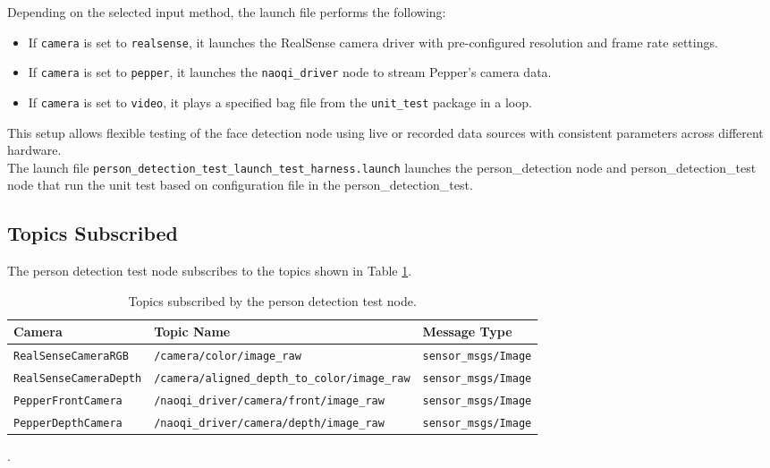 \documentclass{CSSRforAfrica}
\begin{document}
Depending on the selected input method, the launch file performs the following:

\begin{itemize}
	\item If \texttt{camera} is set to \texttt{realsense}, it launches the RealSense camera driver with pre-configured resolution and frame rate settings.
	\item If \texttt{camera} is set to \texttt{pepper}, it launches the \texttt{naoqi\_driver} node to stream Pepper’s camera data.
	\item If \texttt{camera} is set to \texttt{video}, it plays a specified bag file from the \texttt{unit\_test} package in a loop.
\end{itemize}

This setup allows flexible testing of the face detection node using live or recorded data sources with consistent parameters across different hardware.\\

The launch file \texttt{person\_detection\_test\_launch\_test\_harness.launch} launches the person\_detection node and person\_detection\_test node that run the unit test based on configuration file in the person\_detection\_test.

\subsection*{Topics Subscribed}
The person detection test node subscribes to the  topics shown in Table \ref{tab:topics}.

\begin{table}[!h]
	\centering
	{\fontsize{9.0}{12.0}\selectfont %
		\begin{tabularx}{\linewidth}{| l | l | X |}
			\hline
			\rowcolor{blue!20}
			\textbf{Camera} & \textbf{Topic Name} & \textbf{Message Type} \\
			\hline
			\texttt{RealSenseCameraRGB} & \texttt{/camera/color/image\_raw} & \texttt{sensor\_msgs/Image} \\
			\hline
			\texttt{RealSenseCameraDepth} & \texttt{/camera/aligned\_depth\_to\_color/image\_raw} & \texttt{sensor\_msgs/Image} \\
			\hline
			\texttt{PepperFrontCamera} & \texttt{/naoqi\_driver/camera/front/image\_raw} & \texttt{sensor\_msgs/Image} \\
			\hline
			\texttt{PepperDepthCamera} & \texttt{/naoqi\_driver/camera/depth/image\_raw} & \texttt{sensor\_msgs/Image} \\
			\hline
		\end{tabularx}
	}
	\caption{Topics subscribed by the person detection test node.}
\label{tab:topics}.
\end{table}
\end{document}
